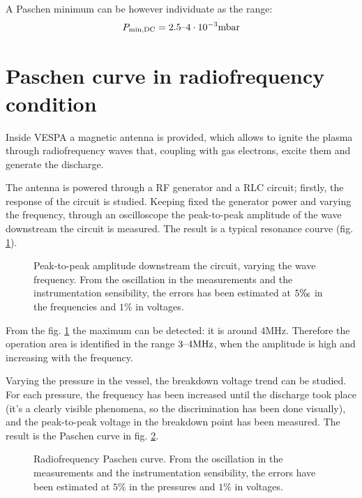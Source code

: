 \documentclass[11pt,a4 paper]{article}
\begin{document}
A Paschen minimum can be however individuate as the range:
\begin{equation*}
  P_{\text{min,DC}} = 2.5\textup{--}4\cdot10^{-3}\si{\milli\bar}
\end{equation*}

\section{Paschen curve in radiofrequency condition}
Inside VESPA a magnetic antenna is provided, which allows to ignite the plasma through radiofrequency waves that, coupling with gas electrons, excite them and generate the discharge.

The antenna is powered through a RF generator and a RLC circuit; firstly, the response of the circuit is studied. Keeping fixed the generator power and varying the frequency, through an oscilloscope the peak-to-peak amplitude of the wave downstream the circuit is measured. The result is a typical resonance courve (fig. \ref{fig:RF:response}).

\begin{figure}[H]
  \centering
  \caption{Peak-to-peak amplitude downstream the circuit, varying the wave frequency.  From the oscillation in the measurements and the instrumentation sensibility, the errors has been estimated at $5\tcperthousand$ in the frequencies and $1\%$ in voltages.}
  \label{fig:RF:response}
\end{figure}

From the fig. \ref{fig:RF:response} the maximum can be detected: it is around $4\si{\mega\hertz}$. Therefore the operation area is identified in the range $3\textup{--}4\si{\mega\hertz}$, when the amplitude is high and increasing with the frequency.

Varying the pressure in the vessel, the breakdown voltage trend can be studied. For each pressure, the frequency has been increased until the discharge took place (it's a clearly visible phenomena, so the discrimination has been done visually), and the peak-to-peak voltage in the breakdown point has been measured. The result is the Paschen curve in fig. \ref{fig:RF:Paschen}.

\begin{figure}[H]
  \centering
  \caption{Radiofrequency Paschen curve. From the oscillation in the measurements and the instrumentation sensibility, the errors have been estimated at $5\%$ in the pressures and $1\%$ in voltages.}
  \label{fig:RF:Paschen}
\end{figure}
\end{document}
